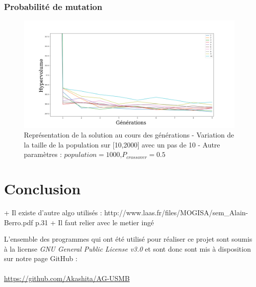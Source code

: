 \documentclass[12pt]{report}
\begin{document}
      \subsection{Probabilité de mutation}
      \begin{figure}[h]
        \centering
        \includegraphics[width=15cm]{img/DTLZ7_mutation.png}
        \caption{Représentation de la solution au cours des générations - Variation de la taille de la population sur [10,2000] avec un pas de 10 - Autre paramètres : $population = 1000$,$P_{crossover} = 0.5$}
        \label{sch_mutation_moy}
      \end{figure}



  \chapter{Conclusion}
   + Il existe d'autre algo utilisés : http://www.laas.fr/files/MOGISA/sem_Alain-Berro.pdf p.31
   + Il faut relier avec le metier ingé

   L'ensemble des programmes qui ont été utilisé pour réaliser ce projet sont soumis à la license \emph{GNU General Public License v3.0} et sont donc sont mis à disposition sur notre page GitHub : \\\\
   \url{https://github.com/Akashita/AG-USMB}

  \appendix

  \nocite{*} %
  
  
\end{document}
